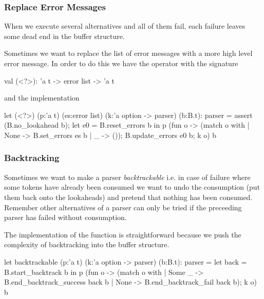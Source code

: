 \subsubsection{Replace Error Messages }

When we execute several alternatives  and all of them
fail, each failure leaves some dead end in the buffer structure.

Sometimes we want to replace the list of error messages with a more high level
error message. In order to do this we have the operator  with the
signature
%
\begin{ocaml}
  val (<?>): 'a t -> error list -> 'a t
\end{ocaml}
%
and the implementation
%
\begin{ocaml}
  let (<?>) (p:'a t) (es:error list) (k:'a option -> parser) (b:B.t): parser =
    assert (B.no_lookahead b);
    let e0 = B.reset_errors b in
    p (fun o ->
          (match o with
           | None -> B.set_errors es b
           | _ ->    ());
          B.update_errors e0 b;
          k o)
      b
\end{ocaml}
%



\subsubsection{Backtracking}

Sometimes we want to make a parser \emph{backtrackable} i.e. in case of
failure where some tokens have already been consumed we want to undo the
consumption (put them back onto the lookaheads) and pretend that nothing has
been consumed. Remember other alternatives of a parser can only be tried if
the preceeding parser has failed without consumption.


The implementation of the function  is
straightforward because we push the complexity of backtracking into the buffer
structure.
%
\begin{ocaml}
  let backtrackable (p:'a t) (k:'a option -> parser) (b:B.t): parser =
    let back = B.start_backtrack b in
    p (fun o ->
         (match o with
          | Some _ -> B.end_backtrack_success back b
          | None ->   B.end_backtrack_fail    back b);
         k o)
      b
\end{ocaml}


